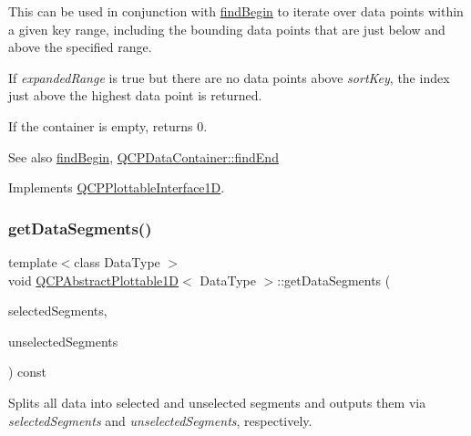 This can be used in conjunction with \hyperlink{class_q_c_p_abstract_plottable1_d_ae6ead74a0d6a17954e1857f361b9ccf2}{find\+Begin} to iterate over data points within a given key range, including the bounding data points that are just below and above the specified range.

If {\itshape expanded\+Range} is true but there are no data points above {\itshape sort\+Key}, the index just above the highest data point is returned.

If the container is empty, returns 0.

\begin{DoxySeeAlso}{See also}
\hyperlink{class_q_c_p_abstract_plottable1_d_ae6ead74a0d6a17954e1857f361b9ccf2}{find\+Begin}, \hyperlink{class_q_c_p_data_container_afb8b8f23cc2b7234a793a25ce79fe48f}{Q\+C\+P\+Data\+Container\+::find\+End} 
\end{DoxySeeAlso}


Implements \hyperlink{class_q_c_p_plottable_interface1_d_a5deced1016bc55a41a2339619045b295}{Q\+C\+P\+Plottable\+Interface1D}.

\mbox{\label{class_q_c_p_abstract_plottable1_d_ae890e62ce403c54f575c73b9529f1af8}} 
\subsubsection{\texorpdfstring{get\+Data\+Segments()}{getDataSegments()}}
{\footnotesize\ttfamily template$<$class Data\+Type $>$ \\
void \hyperlink{class_q_c_p_abstract_plottable1_d}{Q\+C\+P\+Abstract\+Plottable1D}$<$ Data\+Type $>$\+::get\+Data\+Segments (\begin{DoxyParamCaption}\item[{\hyperlink{class_q_list}{Q\+List}$<$ \hyperlink{class_q_c_p_data_range}{Q\+C\+P\+Data\+Range} $>$ \&}]{selected\+Segments,  }\item[{\hyperlink{class_q_list}{Q\+List}$<$ \hyperlink{class_q_c_p_data_range}{Q\+C\+P\+Data\+Range} $>$ \&}]{unselected\+Segments }\end{DoxyParamCaption}) const\hspace{0.3cm}{\ttfamily [protected]}}

Splits all data into selected and unselected segments and outputs them via {\itshape selected\+Segments} and {\itshape unselected\+Segments}, respectively.

